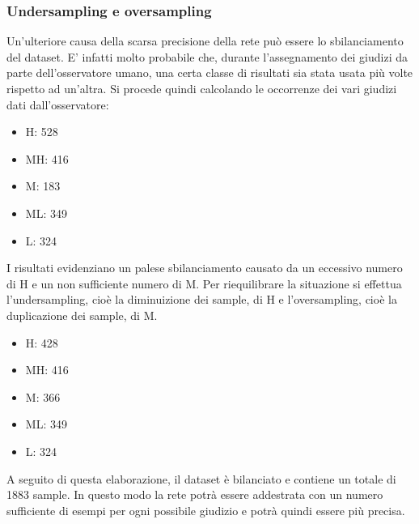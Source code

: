 \documentclass[a4paper,11pt]{article}
\begin{document}
    \subsubsection{Undersampling e oversampling}
    Un'ulteriore causa della scarsa precisione della rete può essere lo sbilanciamento del dataset. E' infatti molto probabile che, durante l'assegnamento dei giudizi da parte dell'osservatore umano, 
    una certa classe di risultati sia stata usata più volte rispetto ad un'altra. Si procede quindi calcolando le occorrenze dei vari giudizi dati dall'osservatore:
    \begin{itemize}
        \item H: 528
        \item MH: 416
        \item M: 183
        \item ML: 349
        \item L: 324
    \end{itemize}
    I risultati evidenziano un palese sbilanciamento causato da un eccessivo numero di H e un non sufficiente numero di M.
    Per riequilibrare la situazione si effettua l'undersampling, cioè la diminuizione dei sample, di H e l'oversampling, cioè la duplicazione dei sample, di M.
    \begin{itemize}
        \item H: 428
        \item MH: 416
        \item M: 366
        \item ML: 349
        \item L: 324
    \end{itemize}
    A seguito di questa elaborazione, il dataset è bilanciato e contiene un totale di 1883 sample.
    In questo modo la rete potrà essere addestrata con un numero sufficiente di esempi per ogni possibile giudizio e potrà quindi essere più precisa.
    \newpage
\end{document}
